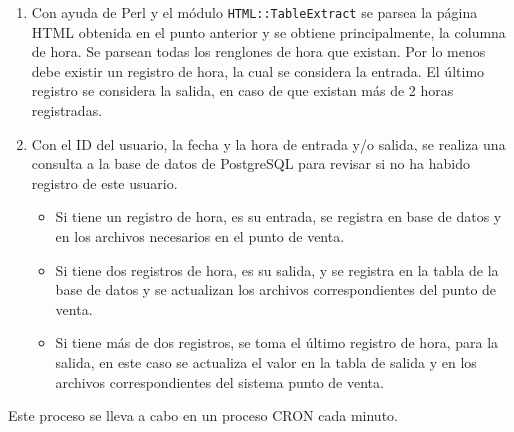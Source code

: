 \begin{enumerate}
 \item Con ayuda de Perl y el módulo \texttt{HTML::TableExtract} se parsea la página HTML obtenida en el punto anterior y se obtiene principalmente, la columna de hora. Se parsean todas los renglones de hora que existan. Por lo menos debe existir un registro de hora, la cual se considera la entrada. El último registro se considera la salida, en caso de que existan más de 2 horas registradas.
 \item Con el ID del usuario, la fecha y la hora de entrada y/o salida, se realiza una consulta a la base de datos de PostgreSQL para revisar si no ha habido registro de este usuario.
 \begin{itemize}
  \item Si tiene un registro de hora, es su entrada, se registra en base de datos y en los archivos necesarios en el punto de venta.
  \item Si tiene dos registros de hora, es su salida, y se registra en la tabla de la base de datos y se actualizan los archivos correspondientes del punto de venta.
  \item Si tiene más de dos registros, se toma el último registro de hora, para la salida, en este caso se actualiza el valor en la tabla de salida y en los archivos correspondientes del sistema punto de venta.
 \end{itemize}

\end{enumerate}

Este proceso se lleva a cabo en un proceso CRON cada minuto.